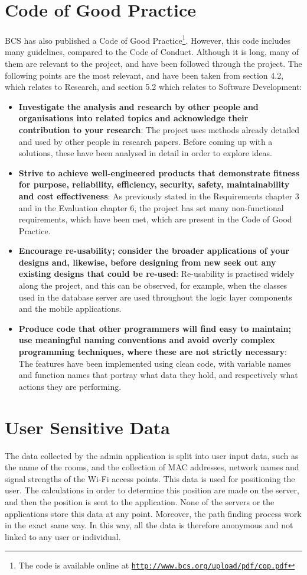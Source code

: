 \section{Code of Good Practice}
BCS has also published a Code of Good Practice\footnote{The code is available online at \texttt{\url{http://www.bcs.org/upload/pdf/cop.pdf}}}. However, this code includes many guidelines, compared to the Code of Conduct. Although it is long, many of them are relevant to the project, and have been followed through the project. The following points are the most relevant, and have been taken from section 4.2, which relates to Research, and section 5.2 which relates to Software Development:
\begin{itemize}
    \item \textbf{Investigate the analysis and research by other people and organisations into related topics and acknowledge their contribution to your research}: The project uses methods already detailed and used by other people in research papers. Before coming up with a solutions, these have been analysed in detail in order to explore ideas.
    \item \textbf{Strive to achieve well-engineered products that demonstrate fitness for purpose, reliability, efficiency, security, safety, maintainability and cost effectiveness}: As previously stated in the Requirements chapter 3 and in the Evaluation chapter 6, the project has set many non-functional requirements, which have been met, which are present in the Code of Good Practice.
    \item \textbf{Encourage re-usability; consider the broader applications of your designs and, likewise, before designing from new seek out any existing designs that could be re-used}: Re-usability is practised widely along the project, and this can be observed, for example, when the classes used in the database server are used throughout the logic layer components and the mobile applications.
    \item \textbf{Produce code that other programmers will find easy to maintain; use meaningful naming conventions and avoid overly complex programming techniques, where these are not strictly necessary}: The features have been implemented using clean code, with variable names and function names that portray what data they hold, and respectively what actions they are performing.
\end{itemize}

\section{User Sensitive Data}
The data collected by the admin application is split into user input data, such as the name of the rooms, and the collection of MAC addresses, network names and signal strengths of the Wi-Fi access points. This data is used for positioning the user. The calculations in order to determine this position are made on the server, and then the position is sent to the application. None of the servers or the applications store this data at any point. Moreover, the path finding process work in the exact same way. In this way, all the data is therefore anonymous and not linked to any user or individual.

